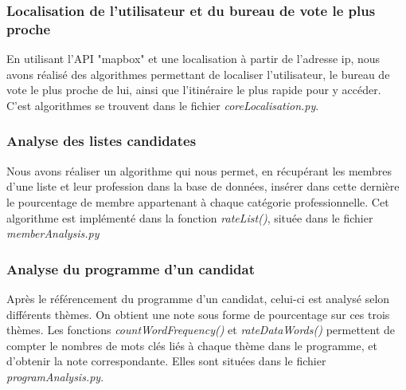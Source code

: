 \subsubsection{Localisation de l'utilisateur et du bureau de vote le plus proche}
\vskip 0.25cm
\noindent
En utilisant l'API "mapbox" et une localisation à partir de l'adresse ip, nous avons réalisé des algorithmes permettant de localiser l'utilisateur, le bureau de vote le plus proche de lui, ainsi que l'itinéraire le plus rapide pour y accéder. C'est algorithmes se trouvent dans le fichier \textit{coreLocalisation.py}. 
\subsubsection{Analyse des listes candidates}
\vskip 0.25cm
\noindent
Nous avons réaliser un algorithme qui nous permet, en récupérant les membres d'une liste et leur profession dans la base de données, insérer dans cette dernière le pourcentage de membre appartenant à chaque catégorie professionnelle. Cet algorithme est implémenté dans la fonction \textit{rateList()}, située dans le fichier \textit{memberAnalysis.py}
\vskip 0.25cm
\subsubsection{Analyse du programme d'un candidat}
\vskip 0.25cm
\noindent
Après le référencement du programme d'un candidat, celui-ci est analysé selon différents thèmes. On obtient une note sous forme de pourcentage sur ces trois thèmes. Les fonctions \textit{countWordFrequency()} et \textit{rateDataWords()} permettent de compter le nombres de mots clés liés à chaque thème dans le programme, et d'obtenir la note correspondante. Elles sont situées dans le fichier \textit{programAnalysis.py}.
